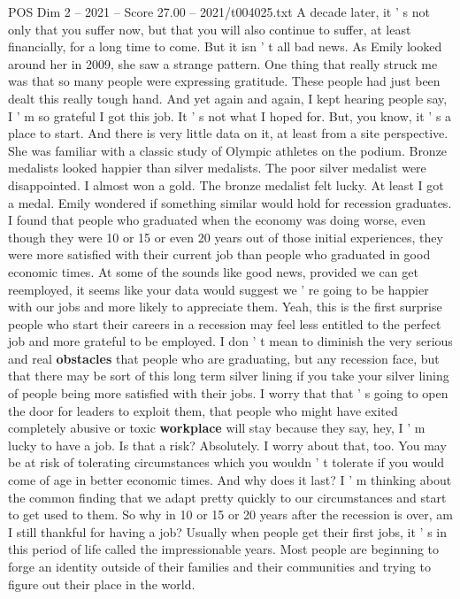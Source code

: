 \begin{textsample}{POS Dim 2 – 2021 – Score 27.00 – 2021/t004025.txt}
A decade later, it ' s not only that you suffer now, but that you will also continue to suffer, at least financially, for a long time to come.
But it isn ' t all bad news.
As Emily looked around her in 2009, she saw a strange pattern.
One thing that really struck me was that so many people were expressing gratitude.
These people had just been dealt this really tough hand.
And yet again and again, I kept hearing people say, I ' m so grateful I got this job.
It ' s not what I hoped for.
But, you know, it ' s a place to start.
And there is very little data on it, at least from a site perspective.
She was familiar with a classic study of Olympic athletes on the podium.
Bronze medalists looked happier than silver medalists.
The poor silver medalist were disappointed.
I almost won a gold.
The bronze medalist felt lucky.
At least I got a medal.
Emily wondered if something similar would hold for recession graduates.
I found that people who graduated when the economy was doing worse, even though they were 10 or 15 or even 20 years out of those initial experiences, they were more satisfied with their current job than people who graduated in good economic times.
At some of the sounds like good news, provided we can get reemployed, it seems like your data would suggest we ' re going to be happier with our jobs and more likely to appreciate them.
Yeah, this is the first surprise people who start their careers in a recession may feel less entitled to the perfect job and more grateful to be employed.
I don ' t mean to diminish the very serious and real \textbf{obstacles} that people who are graduating, but any recession face, but that there may be sort of this long term silver lining if you take your silver lining of people being more satisfied with their jobs.
I worry that that ' s going to open the door for leaders to exploit them, that people who might have exited completely abusive or toxic \textbf{workplace} will stay because they say, hey, I ' m lucky to have a job.
Is that a risk?
Absolutely.
I worry about that, too.
You may be at risk of tolerating circumstances which you wouldn ' t tolerate if you would come of age in better economic times.
And why does it last?
I ' m thinking about the common finding that we adapt pretty quickly to our circumstances and start to get used to them.
So why in 10 or 15 or 20 years after the recession is over, am I still thankful for having a job?
Usually when people get their first jobs, it ' s in this period of life called the impressionable years.
Most people are beginning to forge an identity outside of their families and their communities and trying to figure out their place in the world.

\end{textsample}
